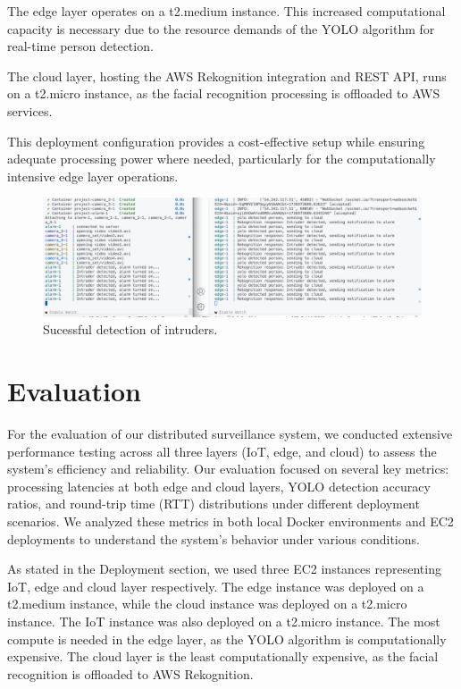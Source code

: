 \documentclass[conference]{IEEEtran}
\begin{document}
The edge layer operates on a t2.medium instance. This increased computational capacity is necessary due to the resource demands of the YOLO algorithm for real-time person detection.

The cloud layer, hosting the AWS Rekognition integration and REST API, runs on a t2.micro instance, as the facial recognition processing is offloaded to AWS services.

This deployment configuration provides a cost-effective setup while ensuring adequate processing power where needed, particularly for the computationally intensive edge layer operations.

\begin{figure}[h!]
    \centering
    \includegraphics[width=1\linewidth]{res/deployment2.png}
    \caption{Sucessful detection of intruders.}
    \label{fig:deployment}
\end{figure}

\section{Evaluation}
For the evaluation of our distributed surveillance system, we conducted extensive performance testing across all three layers (IoT, edge, and cloud) to assess the system's efficiency and reliability. Our evaluation focused on several key metrics: processing latencies at both edge and cloud layers, YOLO detection accuracy ratios, and round-trip time (RTT) distributions under different deployment scenarios. We analyzed these metrics in both local Docker environments and EC2 deployments to understand the system's behavior under various conditions. 

As stated in the Deployment section, we used three EC2 instances representing IoT, edge and cloud layer respectively.  The edge instance was deployed on a t2.medium instance, while the cloud instance was deployed on a t2.micro instance. The IoT instance was also deployed on a t2.micro instance. 
The most compute is needed in the edge layer, as the YOLO algorithm is computationally expensive. The cloud layer is the least computationally expensive, as the facial recognition is offloaded to AWS Rekognition. 
\end{document}
